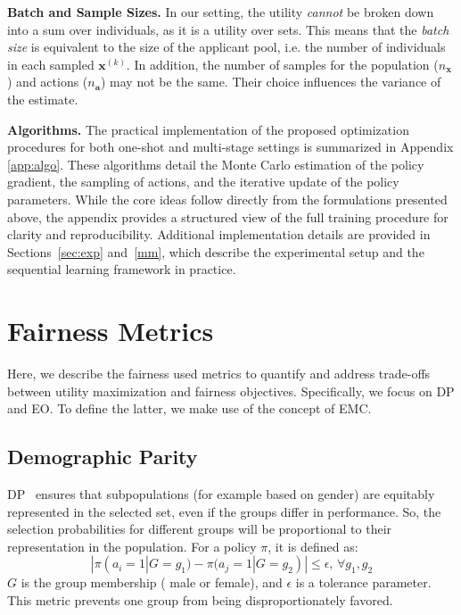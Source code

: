 \documentclass[acmlarge]{acmart-ecaf}
\newcommand {\Pfeat} {\mathbf{x}}
\newcommand {\pol} {\pi}
\newcommand {\Pact} {\mathbf{a}}
\begin{document}
\textbf{Batch and Sample Sizes.}
In our setting, the utility \emph{cannot} be broken down into a sum over individuals, as it is a utility over sets. This means that the \emph{batch size} is equivalent to the size of the applicant pool, i.e. the number of individuals in each sampled $\Pfeat^{(k)}$. In addition,  the number of samples for the population (\( n_\Pfeat \)) and actions (\( n_\Pact \)) may not be the same. Their choice influences the variance of the estimate.

\textbf{Algorithms.} The practical implementation of the proposed optimization procedures for both one-shot and multi-stage settings is summarized in Appendix \ref{app:algo}. These algorithms detail the Monte Carlo estimation of the policy gradient, the sampling of actions, and the iterative update of the policy parameters. While the core ideas follow directly from the formulations presented above, the appendix provides a structured view of the full training procedure for clarity and reproducibility. Additional implementation details are provided in Sections~\ref{sec:exp} and~\ref{mm}, which describe the experimental setup and the sequential learning framework in practice.


\section{Fairness Metrics}

Here, we describe the  fairness used metrics to quantify and address trade-offs between utility maximization and fairness objectives. Specifically, we focus on DP and EO. To define the latter, we make use of the concept of EMC.


 
\subsection{Demographic Parity}

DP~\cite{caton2024fairness}  ensures that subpopulations (for example based on gender) are equitably represented in the selected set, even if the groups differ in performance. So, the selection probabilities for different groups will be proportional to their representation in the population. For a policy \(\pol\), it is defined as:
\begin{equation}
| \pol(a_i = 1 | G = g_1) - \pol(a_j = 1 | G = g_2) | \leq \epsilon, \, \forall g_1, g_2 
 \end{equation}
\(G\) is the group membership ( male or female), and \(\epsilon\) is a tolerance parameter. This metric prevents one group from being disproportionately favored.
\end{document}
